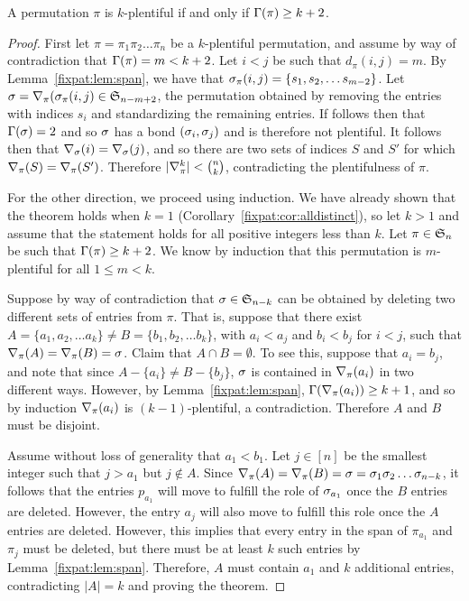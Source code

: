   \begin{theorem} \label{fixpat:thm:kplentiful}
    A permutation $\pi$ is $k$-plentiful if and only if $\Gam(\pi) \geq k+2$. 
  \end{theorem}
  \begin{proof}
    First let $\pi = \pi_1 \pi_2 \dots \pi_n$ be a $k$-plentiful permutation, and
    assume by way of contradiction that $\Gam(\pi) = m < k+2$. Let $i<j$ be
    such that $d_\pi(i,j) = m$. By Lemma~\ref{fixpat:lem:span}, we have that
    $\pspan_\pi(i,j) = \{s_1, s_2, \dots s_{m-2}\}$. Let $\sg =
    \delpi(\pspan_\pi(i,j) \in \S_{n-m+2}$, the permutation obtained by
    removing the entries with indices $s_i$ and standardizing the remaining
    entries. If follows then that $\Gam(\sg) = 2$ and so $\sg$ has a bond
    $(\sg_i, \sg_j)$ and is therefore not plentiful. It follows then that
    $\del_\sg(i) = \del_\sg(j)$, and so there are two sets of indices $S$ and
    $S'$ for which $\del_\pi(S) = \del_\pi(S')$. Therefore $|\delpik| <
    \binom{n}{k}$, contradicting the plentifulness of $\pi$. 

    For the other direction, we proceed using induction.
    We have already shown that the theorem holds when $k=1$
    (Corollary~\ref{fixpat:cor:alldistinct}), so let $k>1$ and assume that the
    statement holds for all positive integers less than $k$.
    Let $\pi \in \S_n$ be such that $\Gam(\pi) \geq k+2$. We know by induction
    that this permutation is $m$-plentiful for all $1 \leq m < k$. 

    Suppose by way of contradiction that $\sg \in \S_{n - k}$ can be obtained
    by deleting two different sets of entries from $\pi$. That is, suppose that
    there exist $A = \{a_1, a_2, \dots a_k\} \neq B = \{b_1, b_2, \dots
    b_k\}$, with $a_i < a_j$ and $b_i < b_j$ for $i < j$, such that $\delpi(A)
    = \delpi(B) = \sg$. Claim that $A \cap B = \emptyset$. To see this, suppose
    that $a_i = b_j$, and note that since $A - \{a_i\} \neq B - \{b_j\}$, 
    $\sg$ is contained in $\delpi(a_i)$ in two different ways. However, by
    Lemma~\ref{fixpat:lem:span}, $\Gam(\delpi(a_i)) \geq k + 1$, and so by
    induction $\delpi(a_i)$ is $(k-1)$-plentiful, a contradiction. Therefore $A$ and
    $B$ must be disjoint. 

    Assume without loss of generality that $a_1 < b_1$. Let $j \in [n]$ be the
    smallest integer such that $j > a_1$ but $j \notin A$. Since $\delpi(A) =
    \delpi(B) = \sg = \sg_1 \sg_2 \dots \sg_{n-k}$, it follows that the
    entries $p_{a_1}$ will move to fulfill the role of $\sg_{a_1}$ once the $B$
    entries are deleted. However, the entry $a_j$ will also move to fulfill
    this role once the $A$ entries are deleted. However, this implies that
    every entry in the span of $\pi_{a_1}$ and $\pi_{j}$ must be deleted, but
    there must be at least $k$ such entries by Lemma~\ref{fixpat:lem:span}.
    Therefore, $A$ must contain $a_1$ and $k$ additional entries, contradicting
    $|A| = k$ and proving the theorem. 
  \end{proof}



